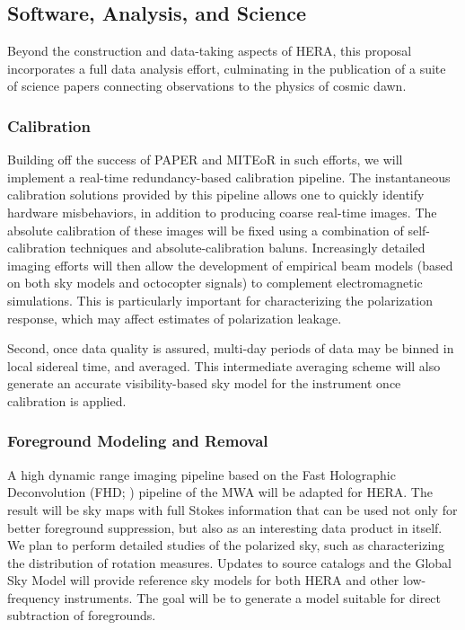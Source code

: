 \documentclass[preprint]{aastex}
\newcommand{\compress}{\vspace{-0.3in}}
\begin{document}
\compress
\subsection{Software, Analysis, and Science}
\label{sec:analysis}

Beyond the construction and data-taking aspects of HERA, this proposal incorporates a full data analysis effort, culminating in the publication of a suite of science papers connecting observations to the physics of cosmic dawn.

\compress
\subsubsection{Calibration}
\label{sec:calibration}

Building off the success of PAPER and MITEoR in such efforts, we will implement a real-time redundancy-based calibration pipeline.  The instantaneous calibration solutions provided by this pipeline allows one to quickly identify hardware misbehaviors, in addition to producing coarse real-time images.  The absolute calibration of these images will be fixed using a combination of self-calibration techniques and absolute-calibration baluns.  Increasingly detailed imaging efforts will then allow the development of empirical beam models (based on both sky models and octocopter signals) to complement electromagnetic simulations.  This is particularly important for characterizing the polarization response, which may affect estimates of polarization leakage.

Second, once data quality is assured, multi-day periods of data may be
binned in local sidereal time, and averaged. This intermediate
averaging scheme will also generate an accurate visibility-based sky
model for the instrument once calibration is applied.

\compress
\subsubsection{Foreground Modeling and Removal}
\label{sec:DataProducts}

A high dynamic range imaging pipeline based on the Fast Holographic Deconvolution (FHD; \citealt{sullivan_et_al2012}) pipeline of the MWA will be adapted for HERA.  The result will be sky maps with full Stokes information that can be used not only for better foreground suppression, but also as an interesting data product in itself.  We plan to perform detailed studies of the polarized sky, such as characterizing the distribution of rotation measures.  Updates to source catalogs and the Global Sky Model \citep{deoliveira2008} will provide reference sky models for both HERA and other low-frequency instruments. The goal will be to generate a model suitable for direct subtraction of foregrounds. 
\end{document}
